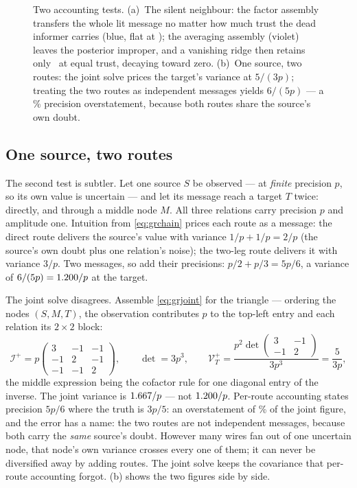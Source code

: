 \begin{figure}[htbp]
\centering
{}
\caption{Two accounting tests.  (a)~The silent neighbour: the factor
assembly transfers the whole lit message no matter how much trust the
dead informer carries (blue, flat at \MacGrDeadPairMin); the
averaging assembly (violet) leaves the posterior improper, and a
vanishing ridge then retains only \MacGrDeadAvgEq\ at equal trust,
decaying toward zero.  (b)~One source, two routes: the joint solve
prices the target's variance at $5/(3p)$; treating the two routes as
independent messages yields $6/(5p)$ --- a
\MacGrRepeatOverstatePct\% precision overstatement, because both
routes share the source's own doubt.}
\label{fig:graccount}
\end{figure}

\subsection{One source, two routes}

The second test is subtler.  Let one source $S$ be observed --- at
\emph{finite} precision $p$, so its own value is uncertain --- and let
its message reach a target $T$ twice: directly, and through a middle
node $M$.  All three relations carry precision $p$ and amplitude one.
Intuition from \cref{eq:grchain} prices each route as a message: the
direct route delivers the source's value with variance
$1/p+1/p=2/p$ (the source's own doubt plus one relation's noise); the
two-leg route delivers it with variance $3/p$.  Two messages, so add
their precisions: $p/2+p/3=5p/6$, a variance of
$6/(5p)=1.200/p$ at the target.

The joint solve disagrees.  Assemble \cref{eq:grjoint} for the
triangle --- ordering the nodes $(S,M,T)$, the observation contributes
$p$ to the top-left entry and each relation its $2\times2$ block:
\[
\mathcal{I}^{+}
=p\begin{pmatrix}3&-1&-1\\-1&2&-1\\-1&-1&2\end{pmatrix},
\qquad
\det=3p^{3},
\qquad
\mathcal{V}^{+}_T
=\frac{p^{2}\det\begin{pmatrix}3&-1\\-1&2\end{pmatrix}}{3p^{3}}
=\frac{5}{3p},
\]
the middle expression being the cofactor rule for one diagonal entry
of the inverse.  The joint variance is
$1.667/p$ --- not $1.200/p$.  Per-route
accounting states precision $5p/6$ where the truth is $3p/5$: an
overstatement of \MacGrRepeatOverstatePct\% of the joint figure, and
the error has a name: the two routes
are not independent messages, because both carry the \emph{same}
source's doubt.  However many wires fan out of one uncertain node,
that node's own variance crosses every one of them; it can never be
diversified away by adding routes.  The joint solve keeps the
covariance that per-route accounting forgot.
(b) shows the two figures side by side.

